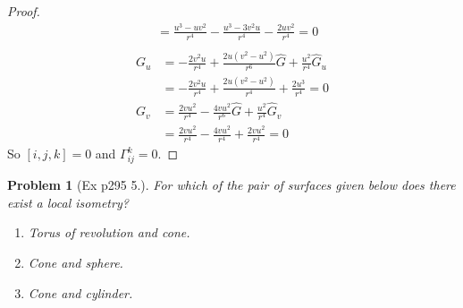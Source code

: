 \documentclass[10pt,a4paper]{article}
\newcounter{theProblemCounter}
\newtheorem{problem}[theProblemCounter]{Problem}
\begin{document}
\begin{proof}
\begin{align*}
&=\frac{u^3-uv^2}{r^4}-\frac{u^3-3v^2u}{r^4}-\frac{2uv^2}{r^4}=0\\
\end{align*}
\begin{align*}
G_u&=-\frac{2v^2u}{r^4}+\frac{2u(v^2-u^2)}{r^6}\hat{G}+\frac{u^2}{r^4}\hat{G}_u\\
&=-\frac{2v^2u}{r^4}+\frac{2u(v^2-u^2)}{r^4}+\frac{2u^3}{r^4}=0\\
G_v&=\frac{2vu^2}{r^4}-\frac{4vu^2}{r^6}\hat{G}+\frac{u^2}{r^4}\hat{G}_v\\
&=\frac{2vu^2}{r^4}-\frac{4vu^2}{r^4}+\frac{2vu^2}{r^4}=0
\end{align*}
So $[i,j,k]=0$ and $\Gamma_{ij}^k=0$.
\end{proof}

\setcounter{theProblemCounter}{4}
\begin{problem}[Ex p295 5.]
For which of the pair of surfaces given below does there exist a local isometry?
\begin{enumerate}
\item[(a)] Torus of revolution and cone.
\item[(b)] Cone and sphere.
\item[(c)] Cone and cylinder.
\end{enumerate}
\end{problem}
\end{document}
